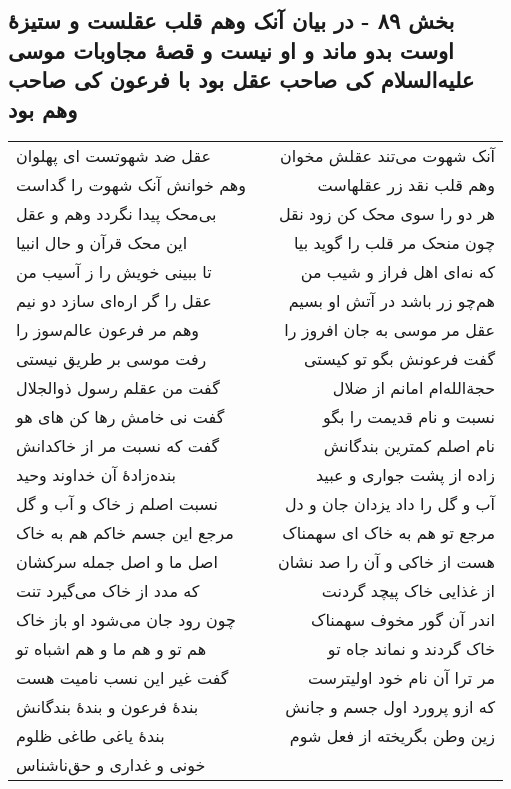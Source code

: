 \begin{center}
\section*{بخش ۸۹ - در بیان آنک وهم قلب عقلست و ستیزهٔ  اوست بدو ماند و او نیست و قصهٔ مجاوبات موسی علیه‌السلام کی صاحب عقل بود با فرعون کی صاحب وهم بود}
\label{sec:sh089}
\begin{longtable}{l p{0.5cm} r}
عقل ضد شهوتست ای پهلوان
&&
آنک شهوت می‌تند عقلش مخوان
\\
وهم خوانش آنک شهوت را گداست
&&
وهم قلب نقد زر عقلهاست
\\
بی‌محک پیدا نگردد وهم و عقل
&&
هر دو را سوی محک کن زود نقل
\\
این محک قرآن و حال انبیا
&&
چون منحک مر قلب را گوید بیا
\\
تا ببینی خویش را ز آسیب من
&&
که نه‌ای اهل فراز و شیب من
\\
عقل را گر اره‌ای سازد دو نیم
&&
هم‌چو زر باشد در آتش او بسیم
\\
وهم مر فرعون عالم‌سوز را
&&
عقل مر موسی به جان افروز را
\\
رفت موسی بر طریق نیستی
&&
گفت فرعونش بگو تو کیستی
\\
گفت من عقلم رسول ذوالجلال
&&
حجةالله‌ام امانم از ضلال
\\
گفت نی خامش رها کن های هو
&&
نسبت و نام قدیمت را بگو
\\
گفت که نسبت مر از خاکدانش
&&
نام اصلم کمترین بندگانش
\\
بنده‌زادهٔ آن خداوند وحید
&&
زاده از پشت جواری و عبید
\\
نسبت اصلم ز خاک و آب و گل
&&
آب و گل را داد یزدان جان و دل
\\
مرجع این جسم خاکم هم به خاک
&&
مرجع تو هم به خاک ای سهمناک
\\
اصل ما و اصل جمله سرکشان
&&
هست از خاکی و آن را صد نشان
\\
که مدد از خاک می‌گیرد تنت
&&
از غذایی خاک پیچد گردنت
\\
چون رود جان می‌شود او باز خاک
&&
اندر آن گور مخوف سهمناک
\\
هم تو و هم ما و هم اشباه تو
&&
خاک گردند و نماند جاه تو
\\
گفت غیر این نسب نامیت هست
&&
مر ترا آن نام خود اولیترست
\\
بندهٔ فرعون و بندهٔ بندگانش
&&
که ازو پرورد اول جسم و جانش
\\
بندهٔ یاغی طاغی ظلوم
&&
زین وطن بگریخته از فعل شوم
\\
خونی و غداری و حق‌ناشناس

\end{longtable}
\end{center}
